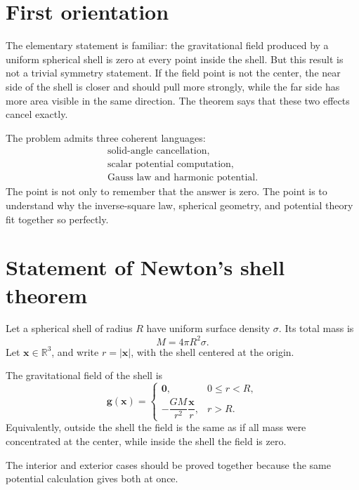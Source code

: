 
\section{First orientation}

The elementary statement is familiar: the gravitational field produced by a uniform spherical shell is zero at every point inside the shell.  But this result is not a trivial symmetry statement.  If the field point is not the center, the near side of the shell is closer and should pull more strongly, while the far side has more area visible in the same direction.  The theorem says that these two effects cancel exactly.

The problem admits three coherent languages:
\[
\begin{array}{c}
  \text{solid-angle cancellation,}\\
  \text{scalar potential computation,}\\
  \text{Gauss law and harmonic potential.}
\end{array}
\]
The point is not only to remember that the answer is zero.  The point is to understand why the inverse-square law, spherical geometry, and potential theory fit together so perfectly.

\section{Statement of Newton's shell theorem}

Let a spherical shell of radius \(R\) have uniform surface density \(\sigma\).  Its total mass is
\[
  M=4\pi R^2\sigma.
\]
Let \(\mathbf x\in\mathbb R^3\), and write \(r=|\mathbf x|\), with the shell centered at the origin.

\begin{theorem}
The gravitational field of the shell is
\[
\mathbf g(\mathbf x)=
\begin{cases}
\mathbf 0,&0\le r<R,\\[0.4em]
-\dfrac{GM}{r^2}\dfrac{\mathbf x}{r},&r>R.
\end{cases}
\]
Equivalently, outside the shell the field is the same as if all mass were concentrated at the center, while inside the shell the field is zero.
\end{theorem}

The interior and exterior cases should be proved together because the same potential calculation gives both at once.

